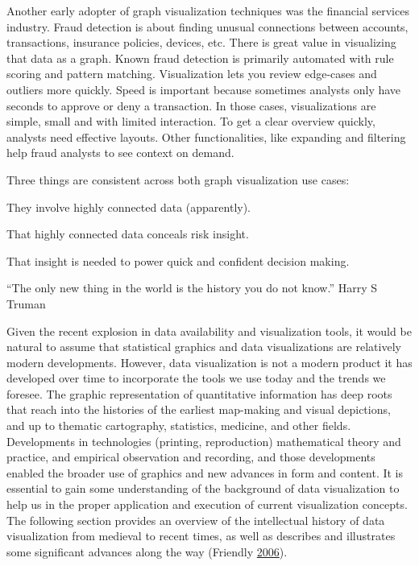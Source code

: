 \documentclass[]{book}
\begin{document}
Another early adopter of graph visualization techniques was the financial services industry. Fraud detection is about finding unusual connections between accounts, transactions, insurance policies, devices, etc. There is great value in visualizing that data as a graph. Known fraud detection is primarily automated with rule scoring and pattern matching. Visualization lets you review edge-cases and outliers more quickly. Speed is important because sometimes analysts only have seconds to approve or deny a transaction. In those cases, visualizations are simple, small and with limited interaction. To get a clear overview quickly, analysts need effective layouts. Other functionalities, like expanding and filtering help fraud analysts to see context on demand.

Three things are consistent across both graph visualization use cases:

They involve highly connected data (apparently).

That highly connected data conceals risk insight.

That insight is needed to power quick and confident decision making.

``The only new thing in the world is the history you do not know.'' Harry S Truman

Given the recent explosion in data availability and visualization tools, it would be natural to assume that statistical graphics and data visualizations are relatively modern developments. However, data visualization is not a modern product it has developed over time to incorporate the tools we use today and the trends we foresee. The graphic representation of quantitative information has deep roots that reach into the histories of the earliest map-making and visual depictions, and up to thematic cartography, statistics, medicine, and other fields.
Developments in technologies (printing, reproduction) mathematical theory and practice, and empirical observation and recording, and those developments enabled the broader use of graphics and new advances in form and content. It is essential to gain some understanding of the background of data visualization to help us in the proper application and execution of current visualization concepts. The following section provides an overview of the intellectual history of data visualization from medieval to recent times, as well as describes and illustrates some significant advances along the way (Friendly \protect\hyperlink{ref-data_viz_history}{2006}).
\end{document}
